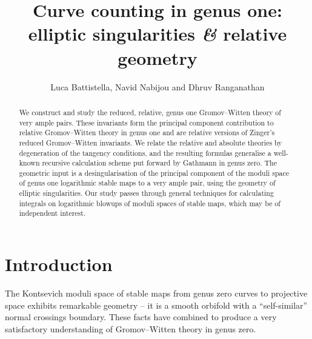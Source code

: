 \documentclass[11pt]{amsart}
\title[Curve counting in genus one: elliptic singularities {\it \&}  relative geometry]{Curve counting in genus one: \\ elliptic singularities {\it \&} relative geometry}
\author{Luca Battistella, Navid Nabijou and Dhruv Ranganathan}
\theoremstyle{definition}
\theoremstyle{definition}
\begin{document}
\begin{abstract}
We construct and study the reduced, relative, genus one Gromov--Witten theory of very ample pairs. These invariants form the principal component contribution to relative Gromov--Witten theory in genus one and are relative versions of Zinger's reduced Gromov--Witten invariants. We relate the relative and absolute theories by degeneration of the tangency conditions, and the resulting formulas generalise a well-known recursive calculation scheme put forward by Gathmann in genus zero. The geometric input is a desingularisation of the principal component of the moduli space of genus one logarithmic stable maps to a very ample pair, using the geometry of elliptic singularities. Our study passes through general techniques for calculating integrals on logarithmic blowups of moduli spaces of stable maps, which may be of independent interest.
\end{abstract}

\maketitle

\appendixtitletocoff
\tableofcontents

\setcounter{section}{0}

\section*{Introduction}

\noindent The Kontsevich moduli space of stable maps from genus zero curves to projective space exhibits remarkable geometry -- it is a smooth orbifold with a ``self-similar'' normal crossings boundary. These facts have combined to produce a very {satisfactory} understanding of Gromov--Witten theory in genus zero. 
\end{document}
